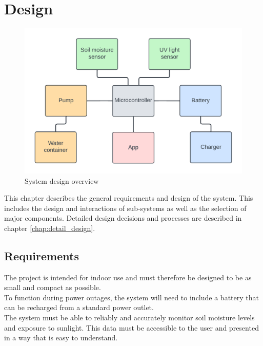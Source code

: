 \graphicspath{{general_design/fig/}}

\chapter{Design}
\label{chap:general_design}

\begin{figure}[!h]
    \centering
    \includegraphics{design_diagram.png}
    \caption{System design overview}
    \label{fig:design_overview}
\end{figure}

This chapter describes the general requirements and design of the system. This includes the design and interactions of sub-systems as well as the selection of major components. Detailed design decisions and processes are described in chapter \ref{chap:detail_design}.

\section{Requirements}
The project is intended for indoor use and must therefore be designed to be as small and compact as possible. \\

To function during power outages, the system will need to include a battery that can be recharged from a standard power outlet. \\

The system must be able to reliably and accurately monitor soil moisture levels and exposure to sunlight. This data must be accessible to the user and presented in a way that is easy to understand. \\

